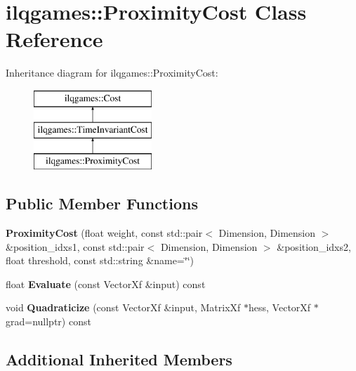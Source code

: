 \hypertarget{classilqgames_1_1_proximity_cost}{}\section{ilqgames\+:\+:Proximity\+Cost Class Reference}
\label{classilqgames_1_1_proximity_cost}
Inheritance diagram for ilqgames\+:\+:Proximity\+Cost\+:\begin{figure}[H]
\begin{center}
\leavevmode
\includegraphics[height=3.000000cm]{classilqgames_1_1_proximity_cost}
\end{center}
\end{figure}
\subsection*{Public Member Functions}
\begin{DoxyCompactItemize}
\item 
{\bfseries Proximity\+Cost} (float weight, const std\+::pair$<$ Dimension, Dimension $>$ \&position\+\_\+idxs1, const std\+::pair$<$ Dimension, Dimension $>$ \&position\+\_\+idxs2, float threshold, const std\+::string \&name=\char`\"{}\char`\"{})\hypertarget{classilqgames_1_1_proximity_cost_a7b9f02baf7979aef9436f3f055fc8b81}{}\label{classilqgames_1_1_proximity_cost_a7b9f02baf7979aef9436f3f055fc8b81}

\item 
float {\bfseries Evaluate} (const Vector\+Xf \&input) const \hypertarget{classilqgames_1_1_proximity_cost_a0c5f46e7dba52dc6b1cb07c718b628ca}{}\label{classilqgames_1_1_proximity_cost_a0c5f46e7dba52dc6b1cb07c718b628ca}

\item 
void {\bfseries Quadraticize} (const Vector\+Xf \&input, Matrix\+Xf $\ast$hess, Vector\+Xf $\ast$grad=nullptr) const \hypertarget{classilqgames_1_1_proximity_cost_a3e71a4237039cc40c7a0d7fc439dc862}{}\label{classilqgames_1_1_proximity_cost_a3e71a4237039cc40c7a0d7fc439dc862}

\end{DoxyCompactItemize}
\subsection*{Additional Inherited Members}



